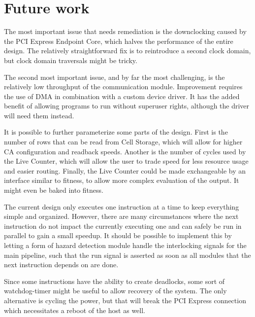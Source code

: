 

\section{Future work}

The most important issue that needs remediation is the downclocking caused by the PCI Express Endpoint Core, which halves the performance of the entire design.
The relatively straightforward fix is to reintroduce a second clock domain, but clock domain traversals might be tricky.

The second most important issue, and by far the most challenging, is the relatively low throughput of the communication module.
Improvement requires the use of DMA in combination with a custom device driver.
It has the added benefit of allowing programs to run without superuser rights, although the driver will need them instead.

It is possible to further parameterize some parts of the design.
First is the number of rows that can be read from Cell Storage, which will allow for higher CA configuration and readback speeds.
Another is the number of cycles used by the Live Counter, which will allow the user to trade speed for less resource usage and easier routing.
Finally, the Live Counter could be made exchangeable by an interface similar to fitness, to allow more complex evaluation of the output.
It might even be baked into fitness.

The current design only executes one instruction at a time to keep everything simple and organized.
However, there are many circumstances where the next instruction do not impact the currently executing one and can safely be run in parallel to gain a small speedup.
It should be possible to implement this by letting a form of hazard detection module handle the interlocking signals for the main pipeline, such that the run signal is asserted as soon as all modules that the next instruction depends on are done.

Since some instructions have the ability to create deadlocks, some sort of watchdog-timer might be useful to allow recovery of the system.
The only alternative is cycling the power, but that will break the PCI Express connection which necessitates a reboot of the host as well.


